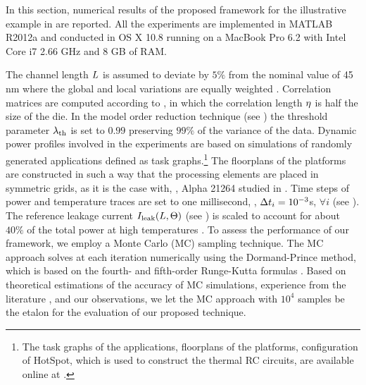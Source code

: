 In this section, numerical results of the proposed framework for the illustrative example in  are reported. All the experiments are implemented in MATLAB R2012a \cite{matlab} and conducted in OS X 10.8 running on a MacBook Pro 6.2 with Intel Core i7 2.66 GHz and 8 GB of RAM.

The channel length $L$ is assumed to deviate by $5\%$ from the nominal value of 45 nm where the global and local variations are equally weighted \cite{juan2011, juan2012}. Correlation matrices are computed according to , in which the correlation length $\eta$ is half the size of the die. In the model order reduction technique (see ) the threshold parameter $\lambda_\text{th}$ is set to $0.99$ preserving $99\%$ of the variance of the data. Dynamic power profiles involved in the experiments are based on simulations of randomly generated applications defined as task graphs.\footnote{The task graphs of the applications, floorplans of the platforms, configuration of HotSpot, which is used to construct the thermal RC circuits, are available online at \cite{sources}.} The floorplans of the platforms are constructed in such a way that the processing elements are placed in symmetric grids, as it is the case with, \eg, Alpha 21264 studied in \cite{juan2011}. Time steps of power and temperature traces are set to one millisecond, \ie, $\Delta t_i = 10^{-3}$s, $\forall i$ (see ). The reference leakage current $I_{\text{leak}}(L, \Theta)$ (see ) is scaled to account for about $40\%$ of the total power at high temperatures \cite{liu2007}. To assess the performance of our framework, we employ a Monte Carlo (MC) sampling technique. The MC approach solves  at each iteration numerically using the Dormand-Prince method, which is based on the fourth- and fifth-order Runge-Kutta formulas \cite{press2007}. Based on theoretical estimations \cite{diaz-emparanza2002} of the accuracy of MC simulations, experience from the literature \cite{xiu2010, eldred2009, maitre2010, shen2009}, and our observations, we let the MC approach with $10^4$ samples be the etalon for the evaluation of our proposed technique.

